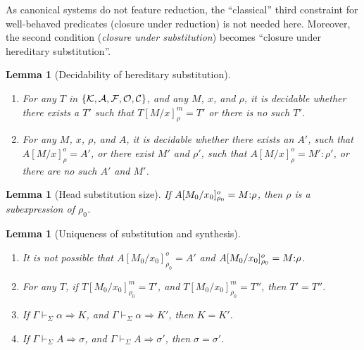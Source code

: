 \documentclass[submission,copyright,creativecommons]{eptcs}
\theoremstyle{plain}
\newtheorem{lemma}[theorem]{Lemma}
\theoremstyle{definition}
\newcommand {\VDASHS} {\vdash_\Sigma} \newcommand {\VDASHO} {\vdash_\Omega} \newcommand {\VDASHCBV} {\vdash_{\Sigma_{{CBV}}}} \newcommand {\VDASHSIMP} {\vdash_{\Sigma_{{Imp}}}} \newcommand {\VDASHSHOARE} {\vdash_{\Sigma_{{Hoare}}}} \newcommand {\VDASHSERASE} {\vdash_{\Sigma^\Erase}}    \newcommand {\VDASHEAL} {\vdash_{EAL}} \newcommand {\VDASHSEAL} {\vdash_{\Sigma_{{EAL}}}} \newcommand {\VDASHFP} {\vdash_{\sf FPST}}
\renewcommand {\L} {\mathcal{L}} \newcommand   {\C} {\mathcal{C}} \newcommand   {\T} {\mathcal{T}} \newcommand   {\U} {\mathcal{U}}
\newcommand{\Erase} {{-\U\L}}
\begin{document}
As canonical systems do not feature reduction, the ``classical'' third
constraint for well-behaved predicates (closure under reduction) is
not needed here. Moreover, the second condition (\emph{closure under
  substitution}) becomes ``closure under hereditary substitution''.
\begin{lemma}[Decidability of hereditary substitution]\hfill
  \begin{enumerate}
  \setlength\itemsep{-0.3ex}
\item For any $T$ in $\{{\mathcal K}, {\mathcal A}, {\mathcal F}, {\mathcal O}, {\mathcal C}\}$,
  and any $M$, $x$, and $\rho$, it is decidable whether there exists a
  $T'$ such that $T[M/x]^m_{\rho}= T'$ or there is no such $T'$.
  \item For any $M$, $x$, $\rho$, and $A$, it is decidable whether
    there exists an $A'$, such that $A[M/x]^o_{\rho}= A'$, or there exist
    $M'$ and $\rho'$, such that $A[M/x]^o_{\rho}= M' : \rho'$, or
    there are no such $A'$ and $M'$.
  \end{enumerate}
\end{lemma}
\begin{lemma}[Head substitution size] If $A[M_0/x_0]_{\rho_0}^{o}=M
  {:} \rho$, then $\rho$ is a subexpression of $\rho_0$.\vspace{-1ex}
\end{lemma}
\begin{lemma}[Uniqueness of substitution and synthesis] \hfill \vspace{-0.5ex}
  \begin{enumerate}
  \setlength\itemsep{-0.3ex}
  \item It is not possible that $A[M_0/x_0]_{\rho_0}^{o}=A'$ and
    $A[M_0/x_0]_{\rho_0}^{o}=M {:} \rho$.
  \item For any $T$, if $T[M_0/x_0]_{\rho_0}^{m} = T'$, and
    $T[M_0/x_0]_{\rho_0}^{m} = T''$, then $T' = T''$.
  \item If $\Gamma \VDASHS \alpha \Rightarrow K$, and
    $\Gamma \VDASHS \alpha \Rightarrow K'$, then $K = K'$.
  \item If $\Gamma \VDASHS A \Rightarrow \sigma$, and
    $\Gamma \VDASHS A \Rightarrow \sigma'$, then $\sigma = \sigma'$.
  \end{enumerate}\vspace{-1ex}
\end{lemma}
\end{document}
